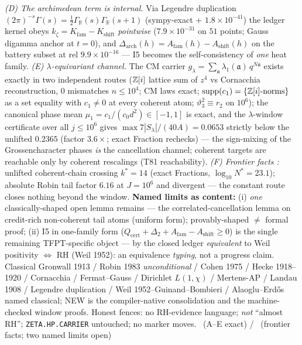 \emph{(D) The archimedean term is internal.} Via Legendre duplication
$(2\pi)^{-s}\Gamma(s)=\tfrac12\Gamma_{\mathbb R}(s)\Gamma_{\mathbb R}(s{+}1)$
(sympy-exact $+$ $1.8\times10^{-41}$) the ledger kernel obeys
$k_\zeta=K_{\mathrm{fam}}-K_{\mathrm{shift}}$ \emph{pointwise}
($7.9\times10^{-31}$ on $51$ points; Gauss digamma anchor at $t=0$), and
$\Delta_{\mathrm{arch}}(h)=A_{\mathrm{fam}}(h)-A_{\mathrm{shift}}(h)$ on the
battery subset at rel $9.9\times10^{-16}$ --- I5 becomes the self-consistency
of \emph{one} heat family.
\emph{(E) $\lambda$-equivariant channel.} The CM carrier
$g_\lambda=\sum_{\mathfrak a}\lambda_1(\mathfrak a)\,q^{N\mathfrak a}$ exists
exactly in two independent routes ($\mathbb{Z}[i]$ lattice sum of $z^4$ vs Cornacchia
reconstruction, $0$ mismatches $n\le10^4$; CM laws exact;
$\operatorname{supp}(c_1)=\{\mathbb{Z}[i]\text{-norms}\}$ as a set equality with
$c_1\ne0$ at every coherent atom; $\vartheta_3^2\equiv r_2$ on $10^6$); the
canonical phase mean $\mu_1=c_1/(c_0d^2)\in[-1,1]$ is exact, and the
$\lambda$-window certificate over all $j\le10^6$ gives
$\max 7|S_\lambda|/(40A)=0.0653$ strictly below the unlifted $0.2365$
(factor $3.6\times$; exact Fraction rechecks) --- the sign-mixing of the
Grossencharacter phases \emph{is} the cancellation channel; coherent targets
are reachable only by coherent rescalings (T81 reachability).
\emph{(F) Frontier facts \mC:} unlifted coherent-chain crossing $k^*=14$
(exact Fractions, $\log_{10}N^*=23.1$); absolute Robin tail factor $6.16$ at
$J=10^6$ and divergent --- the constant route closes nothing beyond the window.
\textbf{Named limits as content:} (i) \emph{one} classically-shaped open lemma
remains --- the correlated-cancellation lemma on credit-rich non-coherent tail
atoms (uniform form); provably-shaped $\neq$ formal proof; (ii) I5 in
one-family form
($Q_{\mathrm{cert}}+\Delta_2+A_{\mathrm{fam}}-A_{\mathrm{shift}}\ge0$) is the
single remaining TFPT-specific object --- by the closed ledger
\emph{equivalent} to Weil positivity $\Longleftrightarrow$ RH (Weil 1952): an
equivalence \emph{typing}, not a progress claim.
Classical Gronwall 1913 / Robin 1983 \emph{unconditional} / Cohen 1975 /
Hecke 1918--1920 / Cornacchia / Fermat--Gauss / Dirichlet $L(1,\chi)$ /
Mertens-AP / Landau 1908 / Legendre duplication / Weil 1952--Guinand--Bombieri
/ Alaoglu--Erd\H{o}s named classical; NEW is the compiler-native consolidation
and the machine-checked window proofs.
Honest fences: no RH-evidence language; \emph{not} ``almost RH'';
\texttt{ZETA.HP.CARRIER} untouched; no marker moves.
\mE\ (A--E exact) / \mC\ (frontier facts; two named limits open)


